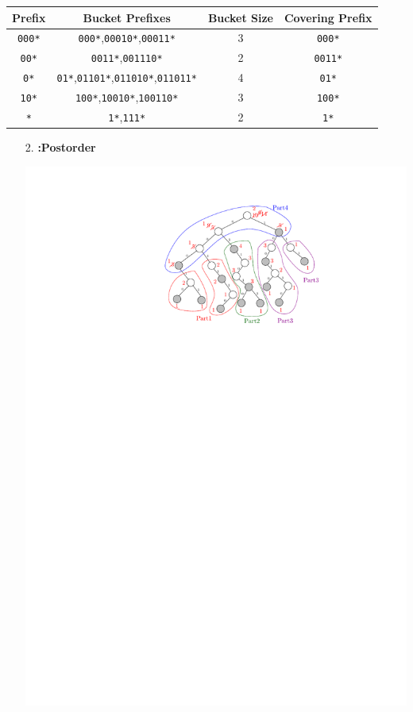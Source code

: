 \begin{qsolve}
	
	\begin{latin}
		\begin{center}
			\begin{tabular}{|c|c|c|c|}
				\hline
				Prefix & Bucket Prefixes & Bucket Size & Covering Prefix  \\
				\hline\hline
				\texttt{000*} & \texttt{000*},\texttt{00010*},\texttt{00011*} & 3 & \texttt{000*}  \\
				\hline
				\texttt{00*} & \texttt{0011*},\texttt{001110*} & 2 & \texttt{0011*}  \\
				\hline
				\texttt{0*} & \texttt{01*},\texttt{01101*},\texttt{011010*},\texttt{011011*} & 4 & \texttt{01*}  \\
				\hline
				\texttt{10*} & \texttt{100*},\texttt{10010*},\texttt{100110*} & 3 & \texttt{100*}  \\
				\hline
				\texttt{*} & \texttt{1*},\texttt{111*} & 2 & \texttt{1*}  \\
				\hline
			\end{tabular}
		\end{center}
	\end{latin}
	
	
	\begin{enumerate}
		\item [2.] \textbf{:Postorder}
		
		
		\begin{center}
			\includegraphics*[width=0.7\linewidth]{pics/110b.pdf}
		\end{center}
		

\end{enumerate}
\end{qsolve}
